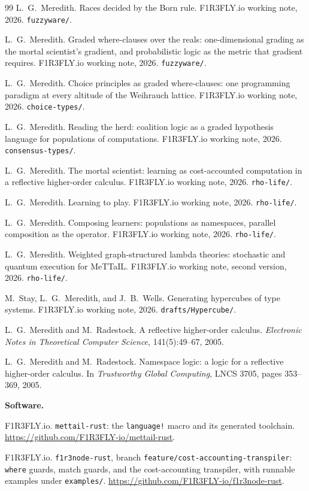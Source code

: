 \documentclass[11pt]{article}
\theoremstyle{definition}
\theoremstyle{plain}
\theoremstyle{remark}
\begin{document}
\begin{thebibliography}{99}
L.~G.~Meredith.
\newblock Races decided by the Born rule.
\newblock F1R3FLY.io working note, 2026. \texttt{fuzzyware/}.

L.~G.~Meredith.
\newblock Graded where-clauses over the reals: one-dimensional grading as the
mortal scientist's gradient, and probabilistic logic as the metric that
gradient requires.
\newblock F1R3FLY.io working note, 2026. \texttt{fuzzyware/}.

L.~G.~Meredith.
\newblock Choice principles as graded where-clauses: one programming paradigm
at every altitude of the Weihrauch lattice.
\newblock F1R3FLY.io working note, 2026. \texttt{choice-types/}.

L.~G.~Meredith.
\newblock Reading the herd: coalition logic as a graded hypothesis language for
populations of computations.
\newblock F1R3FLY.io working note, 2026. \texttt{consensus-types/}.

L.~G.~Meredith.
\newblock The mortal scientist: learning as cost-accounted computation in a
reflective higher-order calculus.
\newblock F1R3FLY.io working note, 2026. \texttt{rho-life/}.

L.~G.~Meredith.
\newblock Learning to play.
\newblock F1R3FLY.io working note, 2026. \texttt{rho-life/}.

L.~G.~Meredith.
\newblock Composing learners: populations as namespaces, parallel composition
as the operator.
\newblock F1R3FLY.io working note, 2026. \texttt{rho-life/}.

L.~G.~Meredith.
\newblock Weighted graph-structured lambda theories: stochastic and quantum
execution for MeTTaIL.
\newblock F1R3FLY.io working note, second version, 2026. \texttt{rho-life/}.

M.~Stay, L.~G.~Meredith, and J.~B.~Wells.
\newblock Generating hypercubes of type systems.
\newblock F1R3FLY.io working note, 2026. \texttt{drafts/Hypercube/}.

L.~G.~Meredith and M.~Radestock.
\newblock A reflective higher-order calculus.
\newblock \emph{Electronic Notes in Theoretical Computer Science},
141(5):49--67, 2005.

L.~G.~Meredith and M.~Radestock.
\newblock Namespace logic: a logic for a reflective higher-order calculus.
\newblock In \emph{Trustworthy Global Computing}, LNCS 3705, pages 353--369,
2005.

\bigskip
\noindent\textbf{Software.}

F1R3FLY.io.
\newblock \texttt{mettail-rust}: the \texttt{language!} macro and its generated
toolchain.
\newblock \url{https://github.com/F1R3FLY-io/mettail-rust}.

F1R3FLY.io.
\newblock \texttt{f1r3node-rust}, branch
\texttt{feature/cost-accounting-transpiler}: \texttt{where} guards, match
guards, and the cost-accounting transpiler, with runnable examples under
\texttt{examples/}.
\newblock \url{https://github.com/F1R3FLY-io/f1r3node-rust}.

\end{thebibliography}
\end{document}
